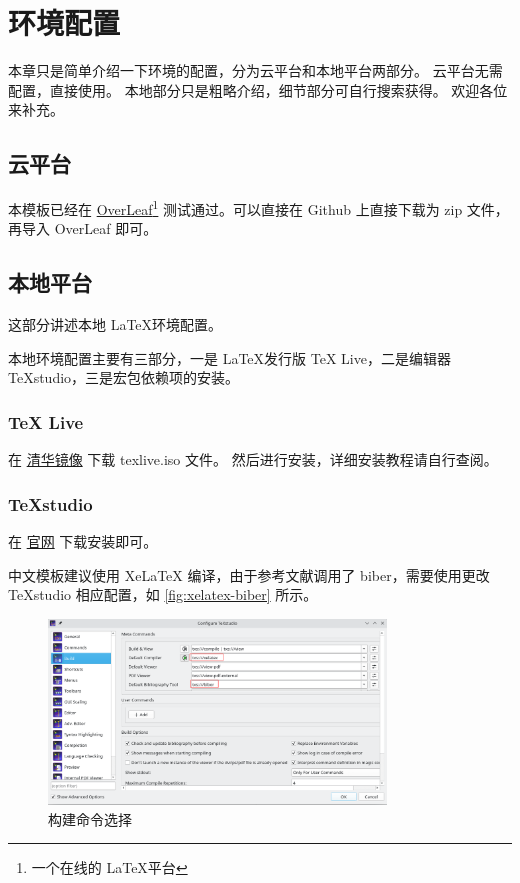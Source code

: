 \chapter{环境配置}

本章只是简单介绍一下环境的配置，分为云平台和本地平台两部分。
云平台无需配置，直接使用。
本地部分只是粗略介绍，细节部分可自行搜索获得。
欢迎各位来补充。

\section{云平台}

本模板已经在 \href{https://www.overleaf.com}{OverLeaf}\footnote{一个在线的 \LaTeX 平台} 测试通过。可以直接在 Github 上直接下载为 zip 文件，再导入 OverLeaf 即可。

\section{本地平台}

这部分讲述本地 \LaTeX 环境配置。

本地环境配置主要有三部分，一是 \LaTeX 发行版 TeX Live，二是编辑器 TeXstudio，三是宏包依赖项的安装。

\subsection{TeX Live}

在 \href{https://mirrors.tuna.tsinghua.edu.cn/CTAN/systems/texlive/Images/}{清华镜像} 下载 texlive.iso 文件。
然后进行安装，详细安装教程请自行查阅。

\subsection{TeXstudio}

在 \href{http://texstudio.sourceforge.net/}{官网} 下载安装即可。

中文模板建议使用 XeLaTeX 编译，由于参考文献调用了 biber，需要使用更改 TeXstudio 相应配置，如 \autoref{fig:xelatex-biber} 所示。

\begin{figure}[H]
    \centering
    \includegraphics[width=0.8\textwidth]{img/xelatex-biber.png}
    \caption{构建命令选择}
    \label{fig:xelatex-biber}
\end{figure}

